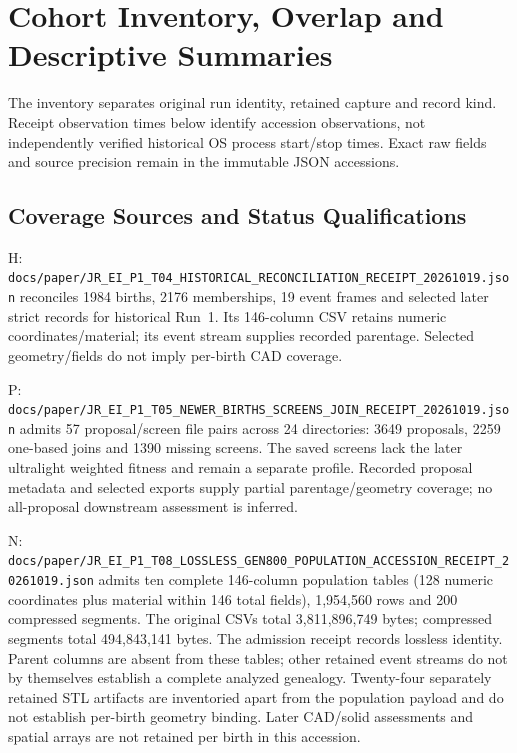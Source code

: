 \section{Cohort Inventory, Overlap and Descriptive Summaries}
\label{sec:cohort-inventory-details}
The inventory separates original run identity, retained capture and record kind. Receipt observation times below identify accession observations, not independently verified historical OS process start/stop times. Exact raw fields and source precision remain in the immutable JSON accessions.

\subsection{Coverage Sources and Status Qualifications}
H: \nolinkurl{docs/paper/JR_EI_P1_T04_HISTORICAL_RECONCILIATION_RECEIPT_20261019.json} reconciles 1984 births, 2176 memberships, 19 event frames and selected later strict records for historical Run~1. Its 146-column CSV retains numeric coordinates/material; its event stream supplies recorded parentage. Selected geometry/fields do not imply per-birth CAD coverage.

P: \nolinkurl{docs/paper/JR_EI_P1_T05_NEWER_BIRTHS_SCREENS_JOIN_RECEIPT_20261019.json} admits 57 proposal/screen file pairs across 24 directories: 3649 proposals, 2259 one-based joins and 1390 missing screens. The saved screens lack the later ultralight weighted fitness and remain a separate profile. Recorded proposal metadata and selected exports supply partial parentage/geometry coverage; no all-proposal downstream assessment is inferred.

N: \nolinkurl{docs/paper/JR_EI_P1_T08_LOSSLESS_GEN800_POPULATION_ACCESSION_RECEIPT_20261019.json} admits ten complete 146-column population tables (128 numeric coordinates plus material within 146 total fields), 1,954,560 rows and 200 compressed segments. The original CSVs total 3,811,896,749 bytes; compressed segments total 494,843,141 bytes. The admission receipt records lossless identity. Parent columns are absent from these tables; other retained event streams do not by themselves establish a complete analyzed genealogy. Twenty-four separately retained STL artifacts are inventoried apart from the population payload and do not establish per-birth geometry binding. Later CAD/solid assessments and spatial arrays are not retained per birth in this accession.

